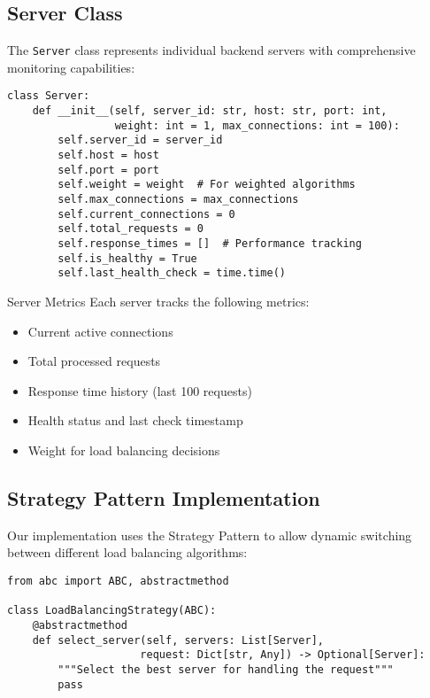 \documentclass[12pt,a4paper]{article}
\begin{document}
\subsection{Server Class}
\label{subsec:serverclass}

The \texttt{Server} class represents individual backend servers with comprehensive monitoring capabilities:

\lstset{style=pythonstyle}
\begin{lstlisting}[caption=Server Class Implementation]
class Server:
    def __init__(self, server_id: str, host: str, port: int, 
                 weight: int = 1, max_connections: int = 100):
        self.server_id = server_id
        self.host = host
        self.port = port
        self.weight = weight  # For weighted algorithms
        self.max_connections = max_connections
        self.current_connections = 0
        self.total_requests = 0
        self.response_times = []  # Performance tracking
        self.is_healthy = True
        self.last_health_check = time.time()
\end{lstlisting}

\begin{infobox}{Server Metrics}
Each server tracks the following metrics:
\begin{itemize}
    \item Current active connections
    \item Total processed requests
    \item Response time history (last 100 requests)
    \item Health status and last check timestamp
    \item Weight for load balancing decisions
\end{itemize}
\end{infobox}

\subsection{Strategy Pattern Implementation}

Our implementation uses the Strategy Pattern to allow dynamic switching between different load balancing algorithms:

\begin{lstlisting}[caption=Strategy Pattern Base Class]
from abc import ABC, abstractmethod

class LoadBalancingStrategy(ABC):
    @abstractmethod
    def select_server(self, servers: List[Server], 
                     request: Dict[str, Any]) -> Optional[Server]:
        """Select the best server for handling the request"""
        pass
\end{lstlisting}
\end{document}
